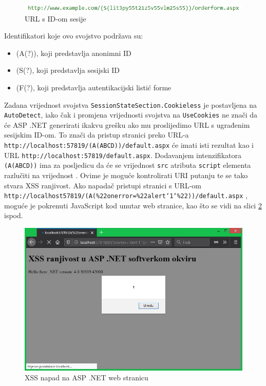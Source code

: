 \documentclass[12pt, oneside, onecolumn]{book}
\begin{document}
{\begin{figure}[H]
	\begin{center}
		\includegraphics[width=\textwidth]{asp_url.jpg}
		\caption{URL s ID-om sesije} \label{fig:asp_url}
	\end{center}
\end{figure}

Identifikatori koje ovo svojstvo podržava su:

\begin{itemize}
\item (A(?)), koji predstavlja anonimni ID
\item (S(?), koji predstavlja sesijski ID
\item (F(?), koji predstavlja autentikacijski listić forme
\end{itemize}

Zadana vrijednost svojstva \texttt{SessionStateSection.Cookieless} je postavljena na \texttt{AutoDetect}, iako čak i promjena vrijednosti svojstva na \texttt{UseCookies} ne znači da će ASP .NET generirati ikakvu grešku ako mu proslijedimo URL s ugrađenim sesijskim ID-om. To znači da pristup stranici preko URL-a \texttt{http://localhost:57819/(A(ABCD))/default.aspx} će imati isti rezultat kao i URL \texttt{http://localhost:57819/default.aspx}. Dodavanjem intenzifikatora \texttt{(A(ABCD))} ima za posljedicu da će se vrijednost \texttt{src} atributa \texttt{script} elementa razlučiti na vrijednost \texttt{}. Ovime je moguće kontrolirati URI putanju te se tako stvara XSS ranjivost. Ako napadač pristupi stranici s URL-om \texttt{http://localhost57819/(A(\%22onerror=\%22alert`1`\%22))/default.aspx} , moguće je pokrenuti JavaScript kod unutar web stranice, kao što se vidi na slici \ref{fig:asp_xss} ispod.

\begin{figure}[H]
	\begin{center}
		\includegraphics[width=\textwidth]{asp_xss.jpg}
		\caption{XSS napad na ASP .NET web stranicu} \label{fig:asp_xss}
	\end{center}
\end{figure}

}
\end{document}
